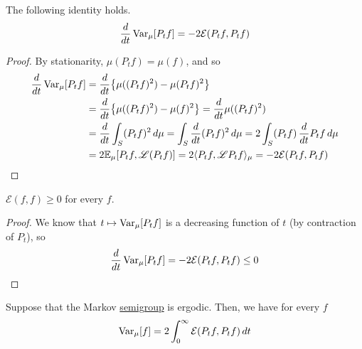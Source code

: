   \begin{lemma}
    \label{thm:derivative-of-the-variance-along-the-semigroup}
  The following identity holds. 
  \begin{equation}
    \frac{d}{dt} \operatorname{Var}_\mu [P_t f] = -2 \mathcal{E} (P_t f, P_t f)
  \end{equation}
  \end{lemma}
  \begin{proof}
  By stationarity, $\mu (P_t f) = \mu(f)$, and so 
  \begin{align*}
      \frac{d}{dt} \operatorname{Var}_\mu [P_t f] & = \frac{d}{dt} \big\{ \mu((P_t f)^2) - \mu(P_t f)^2\big\} \\
      & = \frac{d}{dt} \big\{ \mu((P_t f)^2) - \mu( f)^2\big\} = \frac{d}{dt} \mu((P_t f)^2) \\
      & = \frac{d}{dt} \int_S (P_t f)^2 \, d\mu = \int_S \frac{d}{dt} (P_t f)^2 \,d\mu = 2 \int_S (P_t f) \, \frac{d}{dt} P_t f \, d\mu \\
      & = 2 \mathbb{E}_\mu [P_t f, \mathscr{L} (P_t f) ] = 2 \langle P_t f, \mathscr{L} P_t f \rangle_\mu = -2 \mathcal{E}(P_t f, P_t f) 
  \end{align*}
  \end{proof}

  \begin{theorem}
    \label{thm:nonnegativity-of-the-dirichlet-form}
  $\mathcal{E}(f, f) \geq 0$ for every $f$. 
  \end{theorem}
  \begin{proof}
  We know that $t \mapsto \operatorname{Var}_\mu [P_t f]$ is a decreasing function of $t$ (by contraction of $P_t$), so 
  \begin{equation}
    \frac{d}{dt} \operatorname{Var}_\mu [P_t f] = - 2 \mathcal{E}(P_t f, P_t f) \leq 0
  \end{equation}
  \end{proof}

  \begin{theorem}
    \label{thm:variance-as-an-integral-of-the-dirichlet-form}
  Suppose that the Markov \hyperref[alg-def:semigroup]{semigroup} is ergodic. Then, we have for every $f$ 
  \begin{equation}
    \operatorname{Var}_\mu [f] = 2 \int_0^\infty \mathcal{E}(P_t f, P_t f) \, dt
  \end{equation}
  \end{theorem}

